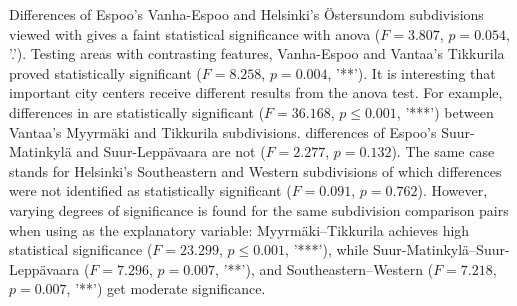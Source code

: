 Differences of Espoo's Vanha-Espoo and Helsinki's Östersundom subdivisions viewed with  gives a faint statistical significance with \acrshort{anova} ($F = 3.807$, $p = 0.054$, '.'). Testing areas with contrasting features, Vanha-Espoo and Vantaa's Tikkurila proved statistically significant ($F = 8.258$, $p = 0.004$, '**'). It is interesting that important city centers receive different results from the \acrshort{anova} test. For example, differences in  are statistically significant ($F = 36.168$, $p \leq 0.001$, ’***’) between Vantaa's Myyrmäki and Tikkurila subdivisions.  differences of Espoo's Suur-Matinkylä and Suur-Leppävaara are not ($F = 2.277$, $p = 0.132$). The same case stands for Helsinki's Southeastern and Western subdivisions of which differences were not identified as statistically significant ($F = 0.091$, $p = 0.762$). However, varying degrees of significance is found for the same subdivision comparison pairs when using  as the explanatory variable: Myyrmäki--Tikkurila achieves high statistical significance ($F = 23.299$, $p \leq 0.001$, ’***’), while Suur-Matinkylä--Suur-Leppävaara ($F = 7.296$, $p = 0.007$, '**'), and Southeastern--Western ($F = 7.218$, $p = 0.007$, '**') get moderate significance.


